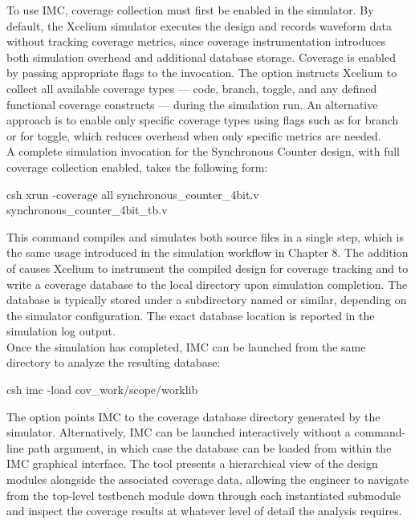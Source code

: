 To use IMC, coverage collection must first be enabled in the simulator. By default, the Xcelium simulator executes the design and records waveform data without tracking coverage metrics, since coverage instrumentation introduces both simulation overhead and additional database storage. Coverage is enabled by passing appropriate flags to the  invocation. The  option instructs Xcelium to collect all available coverage types — code, branch, toggle, and any defined functional coverage constructs — during the simulation run. An alternative approach is to enable only specific coverage types using flags such as  for branch or  for toggle, which reduces overhead when only specific metrics are needed.\\

A complete simulation invocation for the Synchronous Counter design, with full coverage collection enabled, takes the following form:

\begin{codeblock}{csh}
xrun -coverage all synchronous_counter_4bit.v synchronous_counter_4bit_tb.v
\end{codeblock}

This command compiles and simulates both source files in a single step, which is the same usage introduced in the simulation workflow in Chapter 8. The addition of  causes Xcelium to instrument the compiled design for coverage tracking and to write a coverage database to the local directory upon simulation completion. The database is typically stored under a subdirectory named  or similar, depending on the simulator configuration. The exact database location is reported in the simulation log output.\\

Once the simulation has completed, IMC can be launched from the same directory to analyze the resulting database:

\begin{codeblock}{csh}
imc -load cov_work/scope/worklib
\end{codeblock}

The  option points IMC to the coverage database directory generated by the simulator. Alternatively, IMC can be launched interactively without a command-line path argument, in which case the database can be loaded from within the IMC graphical interface. The tool presents a hierarchical view of the design modules alongside the associated coverage data, allowing the engineer to navigate from the top-level testbench module down through each instantiated submodule and inspect the coverage results at whatever level of detail the analysis requires.\\

